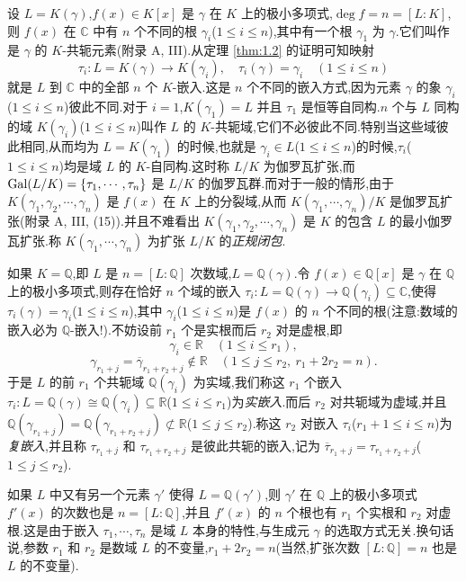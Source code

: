 \begin{remark}
设 $L=K(\gamma)$,$f(x)\in K[x]$ 是 $\gamma$ 在 $K$ 上的极小多项式,$\deg f=n=[L:K]$,则 $f(x)$ 在 $\mathbb{C}$ 中有 $n$ 个不同的根 $\gamma_i$($1\leqslant i\leqslant n$),其中有一个根 $\gamma_1$ 为 $\gamma$.它们叫作是 $\gamma$ 的 $K$-共轭元素(附录 A, III).从定理 \ref{thm:1.2} 的证明可知映射
\[
  \tau_i\colon L=K(\gamma)\to K(\gamma_i),\quad \tau_i(\gamma)=\gamma_i\quad (1\leqslant i\leqslant n)
\]
就是 $L$ 到 $\mathbb{C}$ 中的全部 $n$ 个 $K$-嵌入.这是 $n$ 个不同的嵌入方式,因为元素 $\gamma$ 的象 $\gamma_i$($1\leqslant i\leqslant n$)彼此不同.对于 $i=1$,$K(\gamma_1)=L$ 并且 $\tau_1$ 是恒等自同构.$n$ 个与 $L$ 同构的域 $K(\gamma_i)$($1\leqslant i\leqslant n$)叫作 $L$ 的 $K$-共轭域,它们不必彼此不同.特别当这些域彼此相同,从而均为 $L=K(\gamma_1)$ 的时候,也就是 $\gamma_i\in L$($1\leqslant i\leqslant n$)的时候,$\tau_i$($1\leqslant i\leqslant n$)均是域 $L$ 的 $K$-自同构.这时称 $L/K$ 为伽罗瓦扩张,而 $\operatorname{Gal}(L/K)=\{\tau_1,\cdots,\tau_n\}$ 是 $L/K$ 的伽罗瓦群.而对于一般的情形,由于 $K(\gamma_1,\gamma_2,\cdots,\gamma_n)$ 是 $f(x)$ 在 $K$ 上的分裂域,从而 $K(\gamma_1,\cdots,\gamma_n)/K$ 是伽罗瓦扩张(附录 A, III, (15)).并且不难看出 $K(\gamma_1,\gamma_2,\cdots,\gamma_n)$ 是 $K$ 的包含 $L$ 的最小伽罗瓦扩张.称 $K(\gamma_1,\cdots,\gamma_n)$ 为扩张 $L/K$ 的\emph{正规闭包}.

如果 $K=\mathbb{Q}$,即 $L$ 是 $n=[L:\mathbb{Q}]$ 次数域,$L=\mathbb{Q}(\gamma)$.令 $f(x)\in\mathbb{Q}[x]$ 是 $\gamma$ 在 $\mathbb{Q}$ 上的极小多项式,则存在恰好 $n$ 个域的嵌入 $\tau_i\colon L=\mathbb{Q}(\gamma)\to\mathbb{Q}(\gamma_i)\subseteq\mathbb{C}$,使得 $\tau_i(\gamma)=\gamma_i$($1\leqslant i\leqslant n$),其中 $\gamma_i$($1\leqslant i\leqslant n$)是 $f(x)$ 的 $n$ 个不同的根(注意:数域的嵌入必为 $\mathbb{Q}$-嵌入!).不妨设前 $r_1$ 个是实根而后 $r_2$ 对是虚根,即
\[
  \gamma_i\in\mathbb{R}\quad (1\leqslant i\leqslant r_1),
\]
\[
  \gamma_{r_1+j}=\overline{\gamma}_{r_1+r_2+j}\notin\mathbb{R}\quad
  (1\leqslant j\leqslant r_2,\ r_1+2r_2=n).
\]
于是 $L$ 的前 $r_1$ 个共轭域 $\mathbb{Q}(\gamma_i)$ 为实域,我们称这 $r_1$ 个嵌入 $\tau_i\colon L=\mathbb{Q}(\gamma)\cong\mathbb{Q}(\gamma_i)\subseteq\mathbb{R}$($1\leqslant i\leqslant r_1$)为\emph{实嵌入}.而后 $r_2$ 对共轭域为虚域,并且 $\mathbb{Q}(\gamma_{r_1+j})=\mathbb{Q}(\gamma_{r_1+r_2+j})\not\subset\mathbb{R}$($1\leqslant j\leqslant r_2$).称这 $r_2$ 对嵌入 $\tau_i$($r_1+1\leqslant i\leqslant n$)为\emph{复嵌入},并且称 $\tau_{r_1+j}$ 和 $\tau_{r_1+r_2+j}$ 是彼此共轭的嵌入,记为 $\overline{\tau}_{r_1+j}=\tau_{r_1+r_2+j}$($1\leqslant j\leqslant r_2$).

如果 $L$ 中又有另一个元素 $\gamma'$ 使得 $L=\mathbb{Q}(\gamma')$,则 $\gamma'$ 在 $\mathbb{Q}$ 上的极小多项式 $f'(x)$ 的次数也是 $n=[L:\mathbb{Q}]$,并且 $f'(x)$ 的 $n$ 个根也有 $r_1$ 个实根和 $r_2$ 对虚根.这是由于嵌入 $\tau_1,\cdots,\tau_n$ 是域 $L$ 本身的特性,与生成元 $\gamma$ 的选取方式无关.换句话说,参数 $r_1$ 和 $r_2$ 是数域 $L$ 的不变量,$r_1+2r_2=n$(当然,扩张次数 $[L:\mathbb{Q}]=n$ 也是 $L$ 的不变量).
\end{remark}

